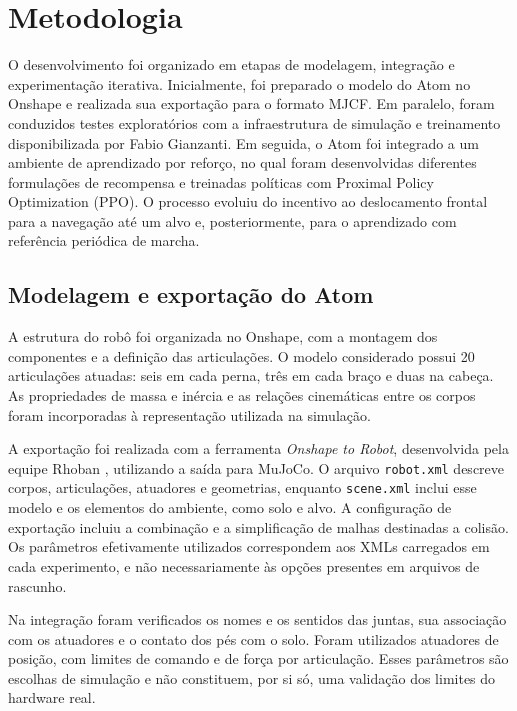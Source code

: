 \section{Metodologia}
\label{sec,metodologia}

O desenvolvimento foi organizado em etapas de modelagem, integração e experimentação iterativa. Inicialmente, foi preparado o modelo do Atom no Onshape e realizada sua exportação para o formato MJCF. Em paralelo, foram conduzidos testes exploratórios com a infraestrutura de simulação e treinamento disponibilizada por Fabio Gianzanti. Em seguida, o Atom foi integrado a um ambiente de aprendizado por reforço, no qual foram desenvolvidas diferentes formulações de recompensa e treinadas políticas com Proximal Policy Optimization (PPO). O processo evoluiu do incentivo ao deslocamento frontal para a navegação até um alvo e, posteriormente, para o aprendizado com referência periódica de marcha.

\subsection{Modelagem e exportação do Atom}

A estrutura do robô foi organizada no Onshape, com a montagem dos componentes e a definição das articulações. O modelo considerado possui 20 articulações atuadas: seis em cada perna, três em cada braço e duas na cabeça. As propriedades de massa e inércia e as relações cinemáticas entre os corpos foram incorporadas à representação utilizada na simulação.

A exportação foi realizada com a ferramenta \textit{Onshape to Robot}, desenvolvida pela equipe Rhoban \cite{gondry2019,allali2024}, utilizando a saída para MuJoCo. O arquivo \texttt{robot.xml} descreve corpos, articulações, atuadores e geometrias, enquanto \texttt{scene.xml} inclui esse modelo e os elementos do ambiente, como solo e alvo. A configuração de exportação incluiu a combinação e a simplificação de malhas destinadas a colisão. Os parâmetros efetivamente utilizados correspondem aos XMLs carregados em cada experimento, e não necessariamente às opções presentes em arquivos de rascunho.

Na integração foram verificados os nomes e os sentidos das juntas, sua associação com os atuadores e o contato dos pés com o solo. Foram utilizados atuadores de posição, com limites de comando e de força por articulação. Esses parâmetros são escolhas de simulação e não constituem, por si só, uma validação dos limites do hardware real.

